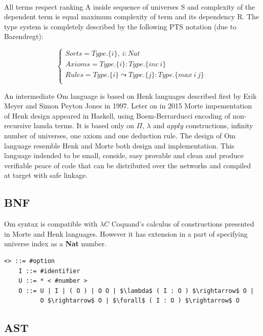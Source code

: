 \documentclass[11pt,oneside]{article}
\begin{document}
   \paragraph{}
   All terms respect ranking A inside sequence of universes S and complexity of the
   dependent term is equal maximum complexity of term and its dependency R. The type
   system is completely described by the following PTS notation (due to Barendregt):

$$
\begin{cases}
    Sorts = Type.\{i\},\ i : Nat\\
    Axioms = Type.\{i\} : Type.\{inc\ i\}\\
    Rules = Type.\{i\} \leadsto Type.\{j\} : Type.\{max\ i\ j\}\\
\end{cases}
$$

   An intermediate Om language is based on Henk\cite{henk} languages described first
   by Erik Meyer and Simon Peyton Jones in 1997. Leter on in 2015 Morte impementation
   of Henk design appeared in Haskell, using Boem-Berrarducci encoding of non-recursive lamda terms.
   It is based only on $\Pi$, $\lambda$ and $apply$ constructions, infinity number of universes,
   one axiom and one deduction rule. The design of Om language resemble Henk and Morte both
   design and implementation. This language indended to be small, conside, easy provable
   and clean and produce verifiable peace of code that can be distributed over the networks
   and compiled at target with safe linkage.

   \subsection{BNF}
\vspace{0.5cm}
   Om syntax is compatible with $\lambda C$ Coquand's calculus of constructions presented in Morte
   and Henk languages. However it has extension in a part of specifying universe index as a {\bf Nat} number.

\vspace{0.5cm}
\begin{lstlisting}[mathescape=true]
   <> ::= #option
    I ::= #identifier
    U ::= * < #number >
    O ::= U | I | ( O ) | O O | $\lambda$ ( I : O ) $\rightarrow$ O |
          O $\rightarrow$ O | $\forall$ ( I : O ) $\rightarrow$ O
\end{lstlisting}

   \subsection{AST}
\end{document}
